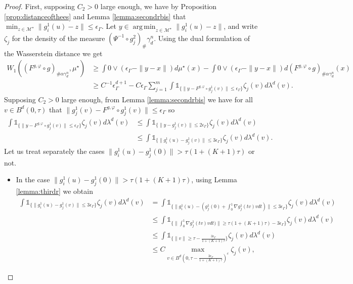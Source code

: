 \documentclass[10pt]{article}
\DeclareMathOperator*{\argmin}{arg\,min}
\begin{document}
\begin{proof}
First, supposing $C_2>0$ large enough, we have by Proposition \ref{prop:distanceofthees} and  Lemma \ref{lemma:secondrbis} that $\min_{z\in \mathcal{M}^\star} \|g_i^1(u)-z\|\leq \epsilon_\Gamma$. Let $y\in \argmin_{z\in \mathcal{M}^\star} \|g_i^1(u)-z\|$, and write $\zeta_j$ for the density of the measure $(\Psi^{-1}\circ g_j^2)_{\#} \gamma_d^n$.
Using the dual formulation of the Wasserstein distance we get
\begin{align}\label{align:w&boundbelow}
W_1((F^{g,\varphi}\circ g)_{\# \alpha \gamma_d^n},\mu^\star) & \geq \int 0\vee (\epsilon_\Gamma-\|y-x\|)d\mu^\star(x)-\int 0\vee (\epsilon_\Gamma-\|y-x\|)d(F^{g,\varphi}\circ g)_{\# \alpha \gamma_d^n}(x)\nonumber\\
    & \geq C^{-1}\epsilon_\Gamma^{d+1}-C\epsilon_\Gamma\sum_{j=1}^m\int \mathds{1}_{\{\|y-F^{g,\varphi}\circ g_j^1(v)\|\leq \epsilon_\Gamma\}}\zeta_j(v)d\lambda^d(v).
\end{align}
Supposing $C_2>0$ large enough, from Lemma \ref{lemma:secondrbis} we have for all $v\in B^d(0,\tau)$ that $\|g_j^1(v)-F^{g,\varphi}\circ g_j^1(v)\|\leq  \epsilon_\Gamma$ so 
\begin{align*}
    \int \mathds{1}_{\{\|y-F^{g,\varphi}\circ g_j^1(v)\|\leq \epsilon_\Gamma\}}\zeta_j(v)d\lambda^d(v)&\leq \int \mathds{1}_{\{\|y-g_j^1(v)\|\leq 2\epsilon_\Gamma\}}\zeta_j(v)d\lambda^d(v)\\
    &\leq \int \mathds{1}_{\{\|g_i^1(u)-g_j^1(v)\|\leq 3\epsilon_\Gamma\}}\zeta_j(v)d\lambda^d(v).
\end{align*}
Let us treat separately the cases $\|g_i^1(u)-g_j^1(0)\|> \tau(1+(K+1)\tau)$ or not.
\begin{itemize}
    \item In the case $\|g_i^1(u)-g_j^1(0)\|> \tau(1+(K+1)\tau)$, using Lemma \ref{lemma:thirdr} we obtain 
\begin{align*}
    \int \mathds{1}_{\{\|g_i^1(u)-g_j^1(v)\|\leq 3\epsilon_\Gamma\}}\zeta_j(v)d\lambda^d(v)&= \int \mathds{1}_{\{\|g_i^1(u)-(g_j^1(0)+\int_0^1\nabla g_j^1(tv)vdt)\|\leq 3\epsilon_\Gamma\}}\zeta_j(v)d\lambda^d(v)\\
    &\leq \int \mathds{1}_{\{\|\int_0^1\nabla g_j^1(tv)vdt)\|\geq \tau(1+(K+1)\tau)-3\epsilon_\Gamma\}}\zeta_j(v)d\lambda^d(v)
    \\
    &\leq \int \mathds{1}_{\{\|v\|\geq \tau-\frac{3\epsilon_\Gamma}{1+(K+1)\tau}\}}\zeta_j(v)d\lambda^d(v)\\
    & \leq C\max_{v\in B^d(0,\tau-\frac{3\epsilon_\Gamma}{1+(K+1)\tau})^c}\zeta_j (v),
\end{align*}

\end{itemize}
\end{proof}
\end{document}
